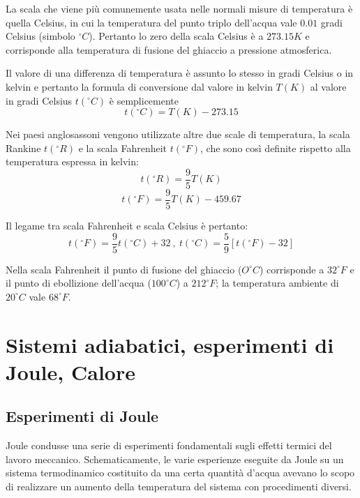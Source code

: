 \documentclass[class=book, crop=false, oneside, 12pt]{standalone}
\begin{document}
La scala che viene più comunemente usata nelle normali misure di temperatura è quella Celsius, in cui la temperatura del punto triplo dell'acqua vale \(0.01\) gradi Celsius (simbolo \(^{\circ} C\)).
Pertanto lo zero della scala Celsius è a \(273.15 K\) e corrisponde alla temperatura di fusione del ghiaccio a pressione atmosferica. 

Il valore di una differenza di temperatura è assunto lo stesso in gradi Celsius o in kelvin e pertanto la formula di conversione dal valore in kelvin \(T (K)\) al valore in gradi Celsius \(t ( ^{\circ} C)\) è semplicemente
\begin{equation*}
    t (^{\circ} C) = T (K) - 273.15
\end{equation*}

Nei paesi anglosassoni vengono utilizzate altre due scale di temperatura, la scala Rankine \(t ( ^{\circ} R)\) e la scala Fahrenheit \( t ( ^{\circ} F)\), che sono così definite rispetto alla temperatura espressa in kelvin:
\begin{equation*}
    t ( ^{\circ} R) = \frac{9}{5} T (K)
\end{equation*}
\begin{equation*}
    t (^{\circ} F) = \frac{9}{5} T (K) - 459.67
\end{equation*}

Il legame tra scala Fahrenheit e scala Celsius è pertanto:
\begin{equation*}
    t (^{\circ} F) = \frac{9}{5} t (^{\circ} C) + 32 \ , \ t(^{\circ} C) = \frac{5}{9} \left[t (^{\circ} F ) - 32\right]
\end{equation*}

Nella scala Fahrenheit il punto di fusione del ghiaccio (\(O ^{\circ} C \)) corrisponde a \(32 ^{\circ} F\) e il punto di ebollizione dell'acqua (\(100 ^{\circ} C\)) a \(212 ^{\circ} F\); la temperatura ambiente di \(20 ^{\circ} C\) vale \(68 ^{\circ} F\). 

\section{Sistemi adiabatici, esperimenti di Joule, Calore}

\subsection{Esperimenti di Joule}

Joule condusse una serie di esperimenti fondamentali sugli effetti termici del lavoro meccanico. 
Schematicamente, le varie esperienze eseguite da Joule su un sistema termodinamico costituito da una certa quantità d'acqua avevano lo scopo di realizzare un aumento della temperatura del sistema con procedimenti diversi. 
\end{document}
